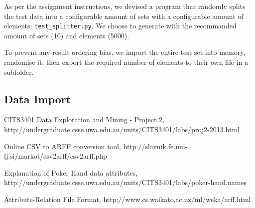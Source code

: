 \documentclass[11pt, a4paper]{article}
\begin{document}
As per the assignment instructions, we devised a program that randomly splits the test data into a configurable amount of sets with a configurable amount of elements; \texttt{test\_splitter.py}. We choose to generate with the recommanded amount of sets (10) and elements (5000).

To prevent any result ordering bias, we import the entire test set into memory, randomise it, then export the required number of elements to their own file in a subfolder.

\subsection*{Data Import}



\begin{thebibliography}{9}

	CITS3401 Data Exploration and Mining - Project 2,
	http://undergraduate.csse.uwa.edu.au/units/CITS3401/labs/proj2-2013.html

	Online CSV to ARFF conversion tool,
	http://slavnik.fe.uni-lj.si/markot/csv2arff/csv2arff.php

	Explanation of Poker Hand data attributes,
	http://undergraduate.csse.uwa.edu.au/units/CITS3401/labs/poker-hand.names

	Attribute-Relation File Format,
	http://www.cs.waikato.ac.nz/ml/weka/arff.html

\end{thebibliography}


\end{document}
